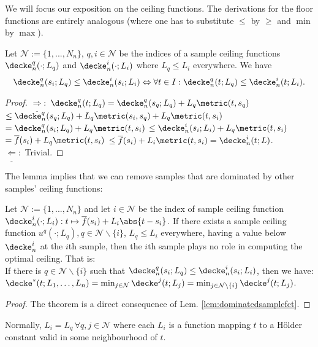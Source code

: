 We will focus our exposition on the ceiling functions. The derivations for the floor functions are entirely analogous (where one has to substitute $\leq$ by $\geq$ and $\min$ by $\max$).

\begin{lem}\label{lem:dominatedsamplefct}
Let $\mathcal N := \{1,...,N_n\}$, $q,i \in \mathcal N$ be the indices of a sample ceiling functions $\decke_n^q(\cdot;L_q)$ and $\decke_n^i(\cdot;L_i)$ where $L_q \leq L_i$ everywhere. We have
\[\decke_n^q(s_i;L_q) \leq \decke_n^i(s_i;L_i) \Leftrightarrow \forall t \in I: \decke_n^q(t;L_q) \leq \decke_n^i(t;L_i).\]
\begin{proof}
$\underline \Rightarrow:$
$\decke_n^q (t;L_q) = \decke_n^q(s_q;L_q) + L_q \metric(t, s_q)$
$\leq \decke_n^q(s_q;L_q) +L_q \metric(s_i, s_q)+ L_q\metric(t,s_i) $
$=\decke_n^q(s_i;L_q) +  L_q\metric(t,s_i)$ 
$\leq \decke_n^i(s_i;L_i) + L_q\metric(t,s_i)  $
$= \overline f(s_i) + L_q\metric(t,s_i)    $
$\leq \overline f(s_i) + L_i\metric(t,s_i)    = \decke_n^i(t;L)$.\\
$\underline \Leftarrow:$ Trivial.
\end{proof}
\end{lem}

The lemma implies that we can remove samples that are dominated by other samples' ceiling functions:
\begin{thm} 
\label{thm:removedominatedsamples}
Let $\mathcal N := \{1,...,N_n\}$ and let $i \in \mathcal N$ be the index of sample ceiling function $\decke_n^i(\cdot;L_i): t \mapsto \overline f(s_i) + L_i \abs{t - s_i}$. If there exists a sample ceiling function $u^q(\cdot;L_q), q \in \mathcal N \backslash \{i\}$, $L_q \leq L_i$ everywhere, having a value below $\decke_n^i$ at the $i$th sample, then the $i$th sample plays no role in computing the optimal ceiling. That is:\\  
If there is $q \in \mathcal N \backslash\{ i\}$ such that $\decke_n^q(s_i;L_q) \leq \decke_n^i(s_i;L_i)$, then we have: \\
$\decke^*(t;L_1,\ldots,L_n) = \min_{j \in \mathcal N} \decke^j(t;L_j) =  \min_{j \in \mathcal N\backslash \{i\}} \decke^j(t;L_j)$.
\begin{proof}
The theorem is a direct consequence of Lem. \ref{lem:dominatedsamplefct}. 
\end{proof}

\end{thm}

\begin{rem}
Normally, $L_i = L_q\, \forall q,j \in \mathcal N$ where each $L_i$ is a function mapping $t$ to a H\"older constant valid in some neighbourhood of $t$.
\end{rem}

